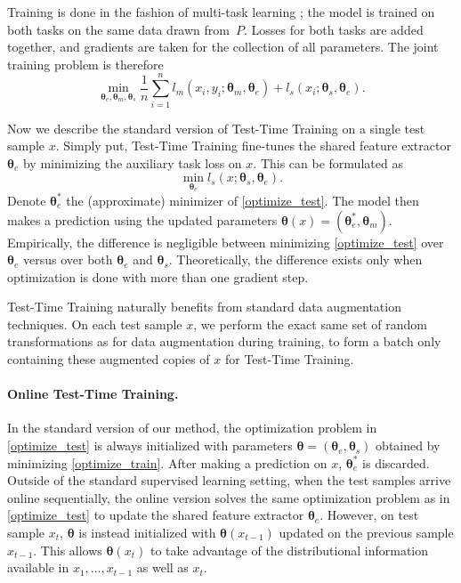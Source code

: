 \documentclass{article}
\theoremstyle{plain}
\theoremstyle{remark}
\theoremstyle{definition}
\newcommand{\opt}{^*}
\def\vtheta{{\bm{\theta}}}
\begin{document}
Training is done in the fashion of multi-task learning \citep{caruana1997multitask}; the model is trained on both tasks on the same data drawn from~$P$. 
Losses for both tasks are added together, and gradients are taken for the collection of all parameters. The joint training problem is therefore
\begin{equation}
\label{optimize_train}
\min_{\vtheta_e,\vtheta_m,\vtheta_s}
\frac{1}{n}\sum_{i=1}^{n} 
l_m(x_i, y_i; \vtheta_m, \vtheta_e)
+ l_s(x_i; \vtheta_s, \vtheta_e).
\end{equation}

Now we describe the standard version of Test-Time Training on a single test sample $x$.
Simply put, Test-Time Training fine-tunes the shared feature extractor $\vtheta_e$ by minimizing the auxiliary task loss on $x$. 
This can be formulated as
\begin{equation}
    \label{optimize_test}
    \min_{\vtheta_e}l_s(x; \vtheta_s, \vtheta_e).
\end{equation}
Denote $\vtheta_e\opt$ the (approximate) minimizer of \autoref{optimize_test}.
The model then makes a prediction using the updated parameters 
$\vtheta(x) = (\vtheta_e\opt, \vtheta_m)$.
Empirically, the difference is negligible between minimizing \autoref{optimize_test} over $\vtheta_e$ versus over both $\vtheta_e$ and $\vtheta_s$.
Theoretically, the difference exists only when optimization is done with more than one gradient step.

Test-Time Training naturally benefits from standard data augmentation techniques. On each test sample $x$, we perform the exact same set of random transformations as for data augmentation during training, to form a batch only containing these augmented copies of $x$ for Test-Time Training.

\paragraph{Online Test-Time Training.}
In the standard version of our method, the optimization problem in
\autoref{optimize_test} is always initialized with parameters 
$\vtheta = (\vtheta_e,\vtheta_s)$ 
obtained by minimizing \autoref{optimize_train}.
After making a prediction on $x$, $\vtheta_e\opt$ is discarded.
Outside of the standard supervised learning setting, 
when the test samples arrive online sequentially, 
the online version solves the same optimization problem as in \autoref{optimize_test} to update the shared feature extractor $\vtheta_e$.
However, on test sample $x_t$, 
$\vtheta$ is instead initialized with $\vtheta(x_{t-1})$ updated on the previous sample $x_{t-1}$.
This allows $\vtheta(x_t)$ to take advantage of the distributional information available in $x_1, \dots,x_{t-1}$ as well as $x_t$.
\end{document}
